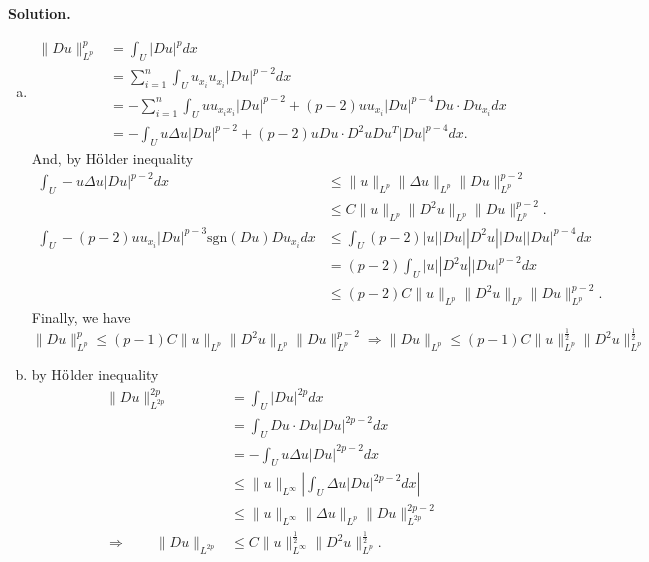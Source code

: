 \documentclass[a4paper]{book}
\newcommand{\sgn}{\mathrm{sgn}}
\newenvironment{solution}%
{\noindent\textbf{Solution.}}%
{\qedhere}
\numberwithin{equation}{chapter}
\theoremstyle{definition}
\begin{document}
\begin{solution}
  \begin{enumerate}[(a)]
  \item
    \begin{align*}
      \| Du \|_{L^p}^p &= \int_U \left| Du \right|^p dx \\
                       &= \sum\limits_{i = 1}^n \int_U u_{x_i} u_{x_i} \left| Du \right|^{p-2}dx \\
                       &= -\sum\limits_{i = 1}^n \int_U u u_{x_i x_i} \left| Du \right|^{p-2} + (p-2)u u_{x_i} \left| Du \right|^{p-4} Du \cdot  D u_{x_i} dx \\
      &= -\int_U u \Delta u \left| Du \right|^{p-2} + (p-2) u Du \cdot D^2 u Du^T \left| Du \right|^{p-4} dx . 
    \end{align*}
    And, by H$\ddot{\textmd{o}}$lder inequality
    \begin{align*}
      \int_U -u \Delta u \left| Du \right|^{p-2} dx &\leq \| u \|_{L^p} \| \Delta u\|_{L^p} \| Du \|_{L^p}^{p-2} \\
                                                    &\leq C  \| u \|_{L^p} \| D^2 u\|_{L^p} \| Du \|_{L^p}^{p-2} .\\
      \int_U - (p-2)u u_{x_i} \left| Du \right|^{p-3} \sgn(Du) D u_{x_i} dx &\leq \int_U (p-2) \left| u \right| \left| Du \right| \left| D^2u \right| \left| Du \right|\left| Du \right|^{p-4} dx \\
                                                    &= (p-2) \int_U \left| u \right| \left| D^2u \right|\left| Du \right|^{p-2} dx \\
                                                    & \leq (p-2)C  \| u \|_{L^p} \| D^2 u\|_{L^p} \| Du \|_{L^p}^{p-2} .
    \end{align*}
    Finally, we have $\|Du \|_{L^p}^p \leq (p-1)C  \| u \|_{L^p} \| D^2 u\|_{L^p} \| Du \|_{L^p}^{p-2} \Longrightarrow \|Du \|_{L^p} \leq (p-1)C  \| u \|_{L^p}^{\frac{1}{2}} \| D^2 u\|_{L^p}^{\frac{1}{2}} $

  \item
    by H$\ddot{\textmd{o}}$lder inequality
    \begin{align*}
      \|Du \|_{L^{2p}}^{2p} & = \int_U \left| Du \right|^{2p} dx \\
                            &= \int_U Du \cdot Du \left| Du \right|^{2p-2} dx \\
                            &= - \int_U u \Delta u \left| Du \right|^{2p-2} dx \\
                            &\leq \|u \|_{L^\infty} \left| \int_U \Delta u \left| Du \right|^{2p-2}dx \right| \\
                            & \leq \|u\|_{L^\infty} \|\Delta u\|_{L^p} \| Du\|_{L^{2p}}^{2p-2} \\
      \Longrightarrow \qquad \|Du \|_{L^{2p}} &\leq C \|u \|_{L^\infty}^{\frac{1}{2}} \| D^2 u\|_{L^p}^{\frac{1}{2}}.  
    \end{align*}
  \end{enumerate}
\end{solution}
\end{document}
